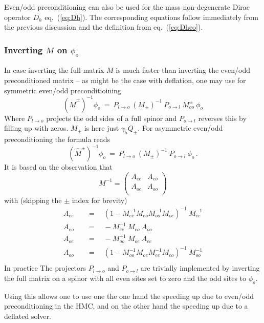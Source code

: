 Even/odd preconditioning can also be used for the mass non-degenerate
Dirac operator $D_h$ eq.~(\ref{eq:Dh}). The corresponding equations
follow immediately from the previous discussion and the definition
from eq.~(\ref{eq:Dheo}).

\subsubsection{Inverting $M$ on $\phi_o$}

In case inverting the full matrix $M$ is much faster than inverting
the even/odd preconditioned matrix -- as might be the case with
deflation, one may use for symmetric even/odd preconditioining
\begin{equation}
  (\hat M^\pm)^{-1}\phi_o\ =\ P_{l\to o}\ (M_\pm)^{-1}\ P_{o\to l}\
  M^\pm_{oo}\ \phi_o
\end{equation}
Where $P_{l\to o}$ projects the odd sides of a full spinor and
$P_{o\to l}$ reverses this by filling up with zeros. $M_\pm$ is here just
$\gamma_5 Q_\pm$. For asymmetric even/odd preconditioning the formula
reads
\begin{equation}
  (\hat M^\pm)^{-1}\phi_o\ =\ P_{l\to o}\ (M_\pm)^{-1}\ P_{o\to l}\
  \phi_o\, .
\end{equation}
It is based on the observation that
\[
M^{-1} = 
\begin{pmatrix}
  A_{ee} & A_{eo} \\
  A_{oe} & A_{oo} \\
\end{pmatrix}
\]
with (skipping the $\pm$ index for brevity)
\[
\begin{split}
  A_{ee}\quad &=\quad (1- M_{ee}^{-1} M_{eo} M_{oo}^{-1} M_{oe})^{-1}\ M_{ee}^{-1} \\
  A_{eo}\quad &=\quad -M_{ee}^{-1}\ M_{eo}\ A_{oo} \\
  A_{oe}\quad &=\quad -M_{oo}^{-1}\ M_{oe}\ A_{ee} \\
  A_{oo}\quad &=\quad (1- M_{oo}^{-1} M_{oe} M_{ee}^{-1} M_{eo})^{-1}\ M_{oo}^{-1} \\
\end{split}
\]
In practice The projectors $P_{l\to o}$ and $P_{o\to l}$ are trivially
implemented by inverting the full matrix on a spinor with all even
sites set to zero and the odd sites to $\phi_o$.

Using this allows one to use one the one hand the speeding up due to
even/odd preconditioning in the HMC, and on the other hand the
speeding up due to a deflated solver.

\endinput


